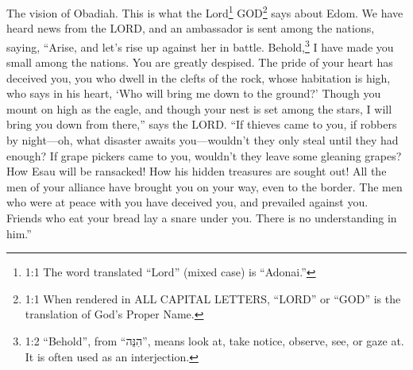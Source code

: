 
\newpage
\null
\thispagestyle{empty}
\newpage
{}




\vspace{-1.36in}

\mychapter{}
\myverse*{}The vision of Obadiah. This is what the Lord\footnote{1:1 The word translated “Lord” (mixed case) is “Adonai.”} GOD\footnote{1:1 When rendered in ALL CAPITAL LETTERS, “LORD” or “GOD” is the translation of God’s Proper Name.} says about Edom. We have heard news from the LORD, and an ambassador is sent among the nations, saying, “Arise, and let’s rise up against her in battle. \myverse{}Behold,\footnote{1:2 “Behold”, from “הִנֵּה”, means look at, take notice, observe, see, or gaze at. It is often used as an interjection.} I have made you small among the nations. You are greatly despised. \myverse{}The pride of your heart has deceived you, you who dwell in the clefts of the rock, whose habitation is high, who says in his heart, ‘Who will bring me down to the ground?’ \myverse{}Though you mount on high as the eagle, and though your nest is set among the stars, I will bring you down from there,” says the LORD. \myverse{}“If thieves came to you, if robbers by night—oh, what disaster awaits you—wouldn’t they only steal until they had enough? If grape pickers came to you, wouldn’t they leave some gleaning grapes? \myverse{}How Esau will be ransacked! How his hidden treasures are sought out! \myverse{}All the men of your alliance have brought you on your way, even to the border. The men who were at peace with you have deceived you, and prevailed against you. Friends who eat your bread lay a snare under you. There is no understanding in him.”

